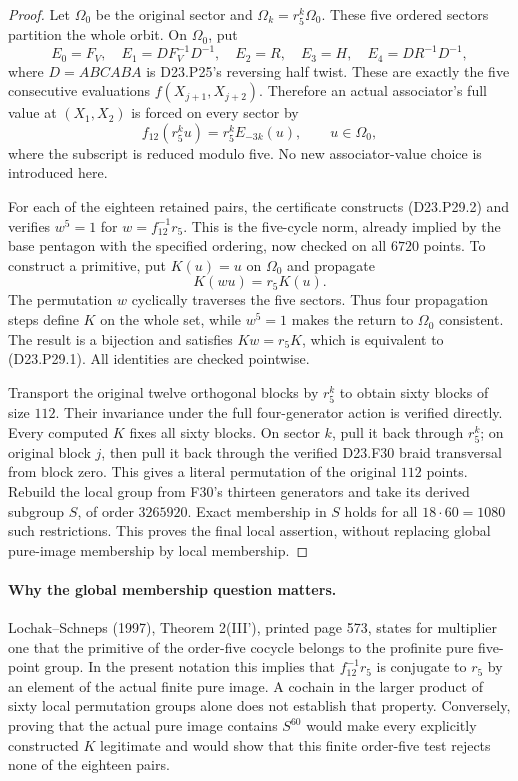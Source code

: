 \begin{proof}
Let $\Omega_0$ be the original sector and
$\Omega_k=r_5^k\Omega_0$. These five ordered sectors
partition the whole orbit. On $\Omega_0$, put
\[
 E_0=F_V,\quad E_1=DF_V^{-1}D^{-1},\quad E_2=R,
 \quad E_3=H,\quad E_4=DR^{-1}D^{-1},
\]
where $D=ABCABA$ is D23.P25's reversing half twist.
These are exactly the five consecutive evaluations
$f(X_{j+1},X_{j+2})$. Therefore an actual associator's
full value at $(X_1,X_2)$ is forced on every sector by
\[
 f_{12}(r_5^ku)=r_5^k E_{-3k}(u),
                 \qquad u\in\Omega_0,                 \tag{D23.P29.2}
\]
where the subscript is reduced modulo five.
No new associator-value choice is introduced here.

For each of the eighteen retained pairs, the certificate
constructs (D23.P29.2) and verifies
$w^5=1$ for $w=f_{12}^{-1}r_5$. This is the five-cycle
norm, already implied by the base pentagon with the
specified ordering, now checked on all $6720$ points.
To construct a primitive, put $K(u)=u$ on $\Omega_0$
and propagate
\[
                         K(wu)=r_5K(u).                 \tag{D23.P29.3}
\]
The permutation $w$ cyclically traverses the five
sectors. Thus four propagation steps define $K$ on
the whole set, while $w^5=1$ makes the return to
$\Omega_0$ consistent. The result is a bijection and
satisfies $Kw=r_5K$, which is equivalent to
(D23.P29.1). All identities are checked pointwise.

Transport the original twelve orthogonal blocks by
$r_5^k$ to obtain sixty blocks of size $112$. Their
invariance under the full four-generator action is
verified directly. Every computed $K$ fixes all sixty
blocks. On sector $k$, pull it back through $r_5^k$;
on original block $j$, then pull it back through the
verified D23.F30 braid transversal from block zero.
This gives a literal permutation of the original
$112$ points. Rebuild the local group from F30's
thirteen generators and take its derived subgroup
$S$, of order $3265920$. Exact membership in $S$
holds for all $18\cdot60=1080$ such restrictions.
This proves the final local assertion, without replacing
global pure-image membership by local membership.
\end{proof}

\paragraph{Why the global membership question matters.}
Lochak--Schneps (1997), Theorem 2(III'), printed page
573, states for multiplier one that the primitive of
the order-five cocycle belongs to the profinite pure
five-point group. In the present notation this implies
that $f_{12}^{-1}r_5$ is conjugate to $r_5$ by an element
of the actual finite pure image. A cochain in the
larger product of sixty local permutation groups alone
does not establish that property. Conversely, proving
that the actual pure image contains $S^{60}$ would
make every explicitly constructed $K$ legitimate and
would show that this finite order-five test rejects
none of the eighteen pairs.

